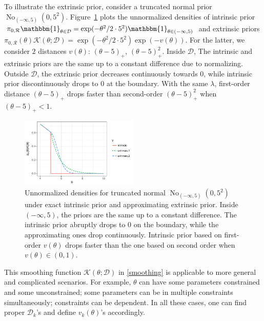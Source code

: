 \documentclass[10pt]{article}
\newcommand{\mc}[1]{\mathcal{#1}}
\DeclareMathOperator{\No}{No}
\DeclareMathOperator{\1}{\mathbbm{1}}
\begin{document}
To illustrate the extrinsic prior, consider a truncated normal prior $\No_{(-\infty,5)}(0,5^2)$. Figure~\ref{truncated_normal} plots the unnormalized densities of intrinsic prior $\pi_{0,\mc R}\mathbbm{1}_{\theta\in \mc D}=\exp(-{\theta^2}/{2\cdot 5^2})\mathbbm{1}_{\theta\in (-\infty,5)}$ and extrinsic priors $ \pi_{0,\mc R}(\theta) \mc{K}( \theta; \mc D) = \exp(-{\theta^2}/{2\cdot 5^2}) \exp(-v(\theta))$. For the latter, we consider $2$ distances $v(\theta)$: $(\theta-5)_+$, $(\theta-5)^2_+$. Inside $\mc D$, The intrinsic and extrinsic priors are the same up to a constant difference due to normalizing. Outside $\mc D$, the extrinsic prior decreases continuously towards 0, while intrinsic prior discontinuously drops to $0$ at the boundary. With the same $\lambda$, first-order distance $(\theta-5)_+$ drops faster than second-order $(\theta-5)_+^2$ when $(\theta-5)_+<1$. %

\begin{figure}[H]
 \centering
 \includegraphics[width=0.5\textwidth]{density_truncated_normal}
\caption{Unnormalized densities for truncated normal $\No_{(-\infty,5)}(0,5^2)$ under exact intrinsic prior and approximating extrinsic prior. Inside $(-\infty,5)$, the priors are the same up to a constant difference. The intrinsic prior abruptly drops to $0$ on the boundary, while the approximating ones drop continuously. Intrinsic prior based on first-order $v(\theta)$ drops faster than the one based on second order when $v(\theta)\in (0,1)$.}
\label{truncated_normal}
\end{figure}


This smoothing function $\mc K(\theta;\mc D)$ in \eqref{smoothing} is applicable to more general and complicated scenarios. For example, $\theta$ can have some parameters constrained and some unconstrained; some parameters can be in multiple constraints simultaneously; constraints can be dependent. In all these cases, one can find proper $\mc D_k$'s and define $v_k(\theta)$'s accordingly.
\end{document}
